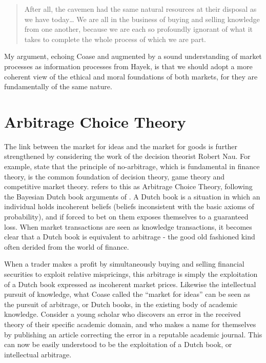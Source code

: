 \documentclass[11pt,]{article}
\begin{document}
\begin{quote}
After all, the cavemen had the same natural resources at their disposal
as we have today\ldots{} We are all in the business of buying and
selling knowledge from one another, because we are each so profoundly
ignorant of what it takes to complete the whole process of which we are
part.
\end{quote}

My argument, echoing Coase and augmented by a sound understanding of
market processes as information processes from Hayek, is that we should
adopt a more coherent view of the ethical and moral foundations of both
markets, for they are fundamentally of the same nature.

\section{Arbitrage Choice Theory}\label{arbitrage-choice-theory}

The link between the market for ideas and the market for goods is
further strengthened by considering the work of the decision theorist
Robert Nau. For example, \citet{NauMcCardle1991} state that the
principle of no-arbitrage, which is fundamental in finance theory, is
the common foundation of decision theory, game theory and competitive
market theory. \citet{Nau1999} refers to this as Arbitrage Choice
Theory, following the Bayesian Dutch book arguments of
\citet{deFinetti1937}. A Dutch book is a situation in which an
individual holds incoherent beliefs (beliefs inconsistent with the basic
axioms of probability), and if forced to bet on them exposes themselves
to a guaranteed loss. When market transactions are seen as knowledge
transactions, it becomes clear that a Dutch book is equivalent to
arbitrage - the good old fashioned kind often derided from the world of
finance.

When a trader makes a profit by simultaneously buying and selling
financial securities to exploit relative mispricings, this arbitrage is
simply the exploitation of a Dutch book expressed as incoherent market
prices. Likewise the intellectual pursuit of knowledge, what Coase
called the ``market for ideas'' can be seen as the pursuit of arbitrage,
or Dutch books, in the existing body of academic knowledge. Consider a
young scholar who discovers an error in the received theory of their
specific academic domain, and who makes a name for themselves by
publishing an article correcting the error in a reputable academic
journal. This can now be easily understood to be the exploitation of a
Dutch book, or intellectual arbitrage.
\end{document}
